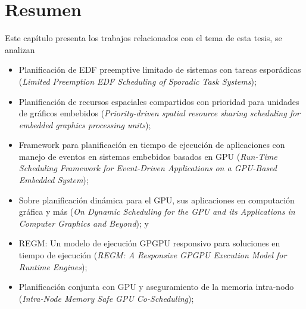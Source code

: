 \section{Resumen}
Este capítulo presenta los trabajos relacionados con el tema de esta tesis, se analizan 
\begin{itemize}
	\item Planificación de EDF preemptive limitado de sistemas con tareas esporádicas
	 (\textit{Limited Preemption EDF Scheduling of Sporadic Task Systems});
	 \item Planificación de recursos espaciales compartidos con prioridad para unidades de gráficos embebidos 
	 (\textit{Priority-driven spatial resource sharing scheduling for embedded graphics processing units});
	\item Framework para planificación en tiempo de ejecución de aplicaciones con manejo de eventos en sistemas embebidos basados en GPU 
	(\textit{Run-Time Scheduling Framework for Event-Driven Applications on a GPU-Based Embedded System});
	\item Sobre planificación dinámica para el GPU, sus aplicaciones en computación gráfica y más
	(\textit{On Dynamic Scheduling for the GPU and its Applications in Computer Graphics and Beyond}); y
	\item REGM: Un modelo de ejecución GPGPU responsivo para soluciones en tiempo de ejecución
	(\textit{REGM: A Responsive GPGPU Execution Model for Runtime Engines});
    	\item Planificación conjunta con GPU y aseguramiento de la memoria intra-nodo 
	(\textit{Intra-Node Memory Safe GPU Co-Scheduling});
 \end{itemize}







